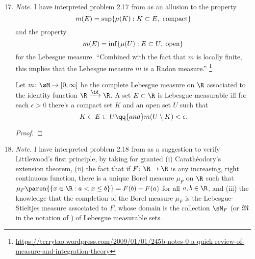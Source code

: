 \documentclass[onesided]{ccg-pset}
\author{Colton Grainger}
\date{\today}
\begin{document}
\maketitle

\begin{enumerate}
\setcounter{enumi}{16}

\item \emph{Note.} I have interpreted problem 2.17 from \cite{RF10} as an allusion to the  property
\begin{equation*}
    m(E) =\sup \{ \mu(K): K \subset E, \hbox{ compact} \}
\end{equation*}
and the  property
\begin{equation*}
    m(E)=\inf\{\mu(U): E \subset U,\hbox{ open}\} 
\end{equation*}
for the Lebesgue measure. ``Combined with the fact that $m$ is locally finite, this implies that the Lebesgue measure $m$ is a Radon measure.''%
    \footnote{%
    \url{https://terrytao.wordpress.com/2009/01/01/245b-notes-0-a-quick-review-of-measure-and-integration-theory}
    }

\begin{prop*}[]
    \label{prop:17}
    Let $m \colon \sM \to [0,\infty]$ be the complete Lebesgue measure on $\R$ associated to the identity function $\R \xrightarrow{\id} \R$. A set $E \subset \R$ is Lebesgue measurable iff for each $\epsilon > 0$ there's a compact set $K$ and an open set $U$ such that 
    \begin{equation}
        \label{closed-open-approx}
        K \subset E \subset U \qq{and} m(U \setminus K) < \epsilon.
    \end{equation}
\end{prop*}

\begin{proof}

\end{proof}

\item \emph{Note.}
    I have interpreted problem 2.18 from \cite{RF10} as a suggestion to verify Littlewood's first principle, by taking for granted
    (i) Carathéodory's extension theorem,
    (ii) the fact that \cite{Fol99} if $F \colon \R \to \R$ is any increasing, right continuous function, there is a unique Borel measure $\mu_F$ on $\R$ such that $\mu_F \paren{\{x \in \R:a< x\le b\}} = F(b) - F(a)$ for all $a,b \in \R$, and
    (iii) the knowledge that the completion of the Borel measure $\mu_F$ is the Lebesgue-Stieltjes measure associated to $F$, whose domain is the collection $\sM_F$ (or $\mathfrak{M}$ in the notation of \cite{RF10}) of Lebesgue measurable sets.


\end{enumerate}
\end{document}
